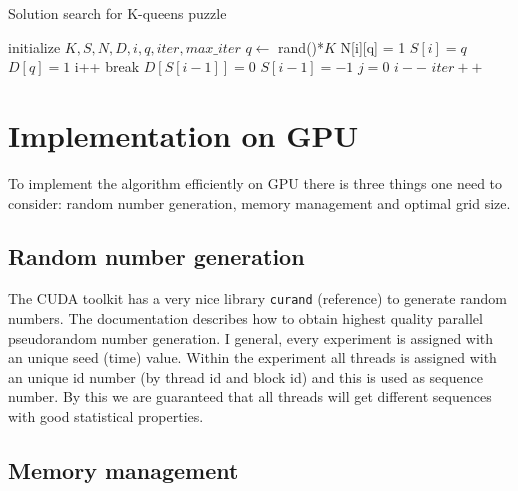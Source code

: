 \documentclass{article}
\begin{document}
\begin{algorithm}[H]
\caption{Solution search for K-queens puzzle}
\label{alg:solvePuzzle}
\begin{algorithmic}[1]
	\State initialize $K, S, N, D, i, q, iter, max\_iter$
    	\State $q \gets$ rand()*$K$
    		\State N[i][q] = 1
    			\State $S[i] = q$
    			\State $D[q] = 1$
    			\State i++
    				\State break
    			\EndIf
    		\EndIf
    	\EndIf 
    	\State $D[S[i-1]] = 0$
		\State $S[i-1] = -1$
			\State $j = 0$
		\EndFor		
		\State $i--$
    \EndIf
    \State $iter++$
    \EndWhile  
\end{algorithmic}
\end{algorithm}

\section{Implementation on GPU}


To implement the algorithm efficiently on GPU there is three things one need to consider: random
number generation, memory management and optimal grid size.

\subsection{Random number generation} %
\label{sub:random_number_generation}
The CUDA toolkit has a very nice library \verb|curand| (reference) to generate random numbers. The documentation describes 
how to obtain highest quality parallel pseudorandom number generation. I general, every experiment is assigned with an unique 
seed (time) value. Within the experiment all threads is assigned with an unique id number (by thread id and block id) and this 
is used as sequence number. By this we are guaranteed that all threads will get different sequences with good statistical 
properties.    

\subsection{Memory management} %
\label{sub:memory_management}
\end{document}
